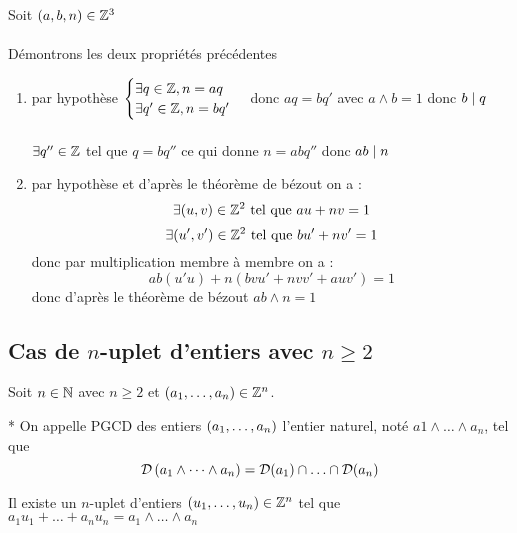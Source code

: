 \begin{dem}
    Soit \((a,b,n) \in \mathbb{Z}^3\)\\~\\
    Démontrons les deux propriétés précédentes
    \begin{enumerate}
        \item par hypothèse \(\begin{cases}
        \exists q \in \mathbb{Z}, n=aq\\
        \exists q' \in \mathbb{Z}, n=bq'
        \end{cases}\)
        donc \(aq = bq'\) avec \(a\wedge b = 1\) donc \(b\mid q\)\\~\\
        \(\exists q'' \in \mathbb{Z}\) tel que \(q = bq''\) ce qui donne \(n = abq''\) donc \(ab \mid n\)
        \item par hypothèse et d'après le théorème de bézout on a :
        \[\exists (u,v) \in \mathbb{Z}^2 \text{ tel que } au+nv=1\]
        \[\exists (u',v') \in \mathbb{Z}^2 \text{ tel que } bu'+nv'=1\]
        donc par multiplication membre à membre on a  : 
        \[ab(u'u) + n(bvu' + nvv'+auv') = 1\]
        donc d'après le théorème de bézout \(ab \wedge n =1\)
    \end{enumerate}
\end{dem}

\subsection{Cas de \(n\)-uplet d’entiers avec \( n \geq 2\) }
Soit \(n \in \mathbb{N}\) avec \(n \geq 2\) et \((a_1, \dots , a_n) \in \mathbb{Z}^n\).

\begin{defprop}*
    On appelle PGCD des entiers \(\left(a_1, \dots , a_n\right)\) l’entier naturel, noté \(a1 \wedge \dots \wedge a_n\), tel que
    \[\mathcal{D}\paren{a_1 \wedge \dots \wedge a_n} = \mathcal{D}(a_1) \inter \dots \inter \mathcal{D}(a_n)\]
\end{defprop}

\begin{defprop}
    Il existe un \(n\)-uplet d’entiers \((u_1, \dots , u_n) \in \mathbb{Z}^n\) tel que  \(a_1u_1 +\dots + a_nu_n = a_1 \wedge \dots \wedge a_n\)
\end{defprop}

